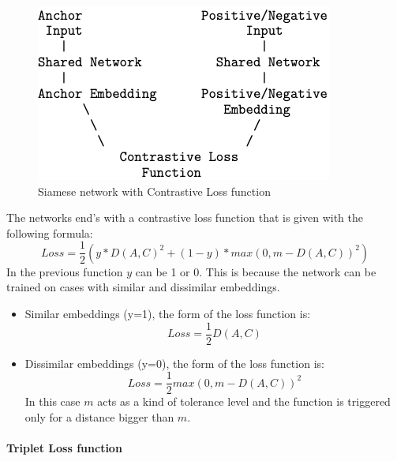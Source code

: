 \documentclass{wseas}
\begin{document}
\begin{figure}[htbp]
  \centering
  \includegraphics[width=\linewidth]{resources/v1/contrastiveLoss.png}
  \caption{Siamese network with Contrastive Loss function}
  \label{fig:contrastive_loss_function_figure}
\end{figure}

The networks end's with a contrastive loss function that is given with
the following formula:
\begin{equation} 
  Loss =  \frac{1}{2} (y*D(A,C)^2 + (1-y)*max(0,m-D(A,C))^2)
\end{equation}
In the previous function \(y\) can be 1 or 0. This is because the
network can be trained on cases with similar and dissimilar embeddings.

\begin{itemize}

\item
  Similar embeddings (y=1), the form of the loss function is: 
  \begin{equation}
    Loss = \frac{1}{2}D(A,C)
  \end{equation}

\item
  Dissimilar embeddings (y=0), the form of the loss function is: 
  \begin{equation}
    Loss =  \frac{1}{2}max(0,m-D(A,C))^2
  \end{equation}
  In this case \(m\) acts as a kind of tolerance level and the
  function is triggered only for a distance bigger than \(m\).
\end{itemize}


\paragraph{Triplet Loss function}
\end{document}
